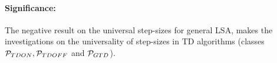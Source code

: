 \paragraph{Significance:} The negative result on the universal step-sizes for general LSA, makes the investigations on the universality of step-sizes in TD algorithms (classes $\P_{TDON}, \P_{TDOFF}$ and $\P_{GTD}$). 
\begin{comment}
\footnote{Of course, the term $C_{P',\alpha}/t^2$ needs to be controlled, as well. Just like \citet{bach}, here we focus on $C_{P,\alpha}$, which is justified if one considers the MSE as $t\to\infty$. Further justification is that we actually find a negative result. See above.}
We show via an example that in general this is not possible.
In particular, the example applies to RL, hence, we get a negative result for RL, which states that from only bounds on the data one cannot choose a step-size $\alpha$ to guarantee that $C_{P,\alpha}$ of CS-PR is uniformly bounded over $\P$.
We also define a subclass  $\P_{\text{SPD},B}$ of problems, related to SGD for LSE, that does `admit' a uniform constant step-size, thereby recovering a part of the result by \citet{bach}.
Our results in particular shed light on the precise structural assumptions that are needed 
to achieve a uniform bound for CS-PR. 
For further details, see \Cref{sec:related}.
\item \textbf{Automatic Step-Size} (\Cref{sec:stepsizes}):
The above negative result implies that in RL one needs to choose the constant step-size based on properties of the instance $P$ to avoid the explosion of the MSE.
To circumvent this, we propose a natural step-size tuning method to guarantee instance-dependent boundedness.
We experimentally evaluate the proposed method and find that it is indeed able to achieve its goal on a set of synthetic examples
where no constant step-size is available to prevent exploding MSE. %

\end{comment}
